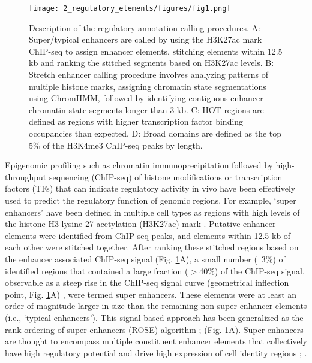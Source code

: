 \begin{figure}
    \centering
    \texttt{[image: 2\_regulatory\_elements/figures/fig1.png]}
    \caption[Description of the regulatory annotation calling procedures]{Description of the regulatory annotation calling procedures. A: Super/typical enhancers are called by using the H3K27ac mark ChIP-seq to assign enhancer elements, stitching elements within 12.5 kb and ranking the stitched segments based on H3K27ac levels. B: Stretch enhancer calling procedure involves analyzing patterns of multiple histone marks, assigning chromatin state segmentations using ChromHMM, followed by identifying contiguous enhancer chromatin state segments longer than 3 kb. C: HOT regions are defined as regions with higher transcription factor binding occupancies than expected. D: Broad domains are defined as the top 5\% of the H3K4me3 ChIP-seq peaks by length.}
    \label{fig:c1_f1}
\end{figure}

Epigenomic profiling such as chromatin immunoprecipitation followed by high-throughput sequencing (ChIP-seq) of histone modifications or transcription factors (TFs) that can indicate regulatory activity in vivo have been effectively used to predict the regulatory function of genomic regions. For example, ‘super enhancers’ have been defined in multiple cell types as regions with high levels of the histone H3 lysine 27 acetylation (H3K27ac) mark \cite{hniszSuperEnhancersControlCell2013}. Putative enhancer elements were identified from ChIP-seq peaks, and elements within 12.5 kb of each other were stitched together. After ranking these stitched regions based on the enhancer associated ChIP-seq signal (Fig. \ref{fig:c1_f1}A), a small number (~3\%) of identified regions that contained a large fraction ($>$40\%) of the ChIP-seq signal, observable as a steep rise in the ChIP-seq signal curve (geometrical inflection point, Fig. \ref{fig:c1_f1}A) \cite{whyteMasterTranscriptionFactors2013}, were termed super enhancers. These elements were at least an order of magnitude larger in size than the remaining non-super enhancer elements (i.e., ‘typical enhancers’). This signal-based approach has been generalized as the rank ordering of super enhancers (ROSE) algorithm \cite{lovenSelectiveInhibitionTumor2013}; \cite{whyteMasterTranscriptionFactors2013} (Fig. \ref{fig:c1_f1}A). Super enhancers are thought to encompass multiple constituent enhancer elements that collectively have high regulatory potential and drive high expression of cell identity regions \cite{whyteMasterTranscriptionFactors2013}; \cite{hniszSuperEnhancersControlCell2013}. \\

